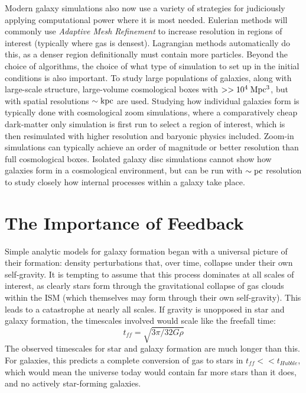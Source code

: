 Modern galaxy simulations also now use a variety of strategies for judiciously
applying computational power where it is most needed.  Eulerian methods will
commonly use \textit{Adaptive Mesh Refinement} to increase resolution in regions of
interest (typically where gas is densest).  Lagrangian methods automatically do
this, as a denser region definitionally must contain more particles.  Beyond the
choice of algorithms, the choice of what type of simulation to set up in the
initial conditions is also important.  To study large populations of galaxies,
along with large-scale structure, large-volume cosmological boxes with
$>>10^4\;\rm{Mpc^3}$, but with spatial resolutions $\sim \rm{kpc}$ are used.
Studying how individual galaxies form is typically done with cosmological zoom
simulations, where a comparatively cheap dark-matter only simulation is first
run to select a region of interest, which is then resimulated with higher
resolution and baryonic physics included. Zoom-in simulations can typically
achieve an order of magnitude or better resolution than full cosmological boxes.
Isolated galaxy disc simulations cannot show how galaxies form in a cosmological
environment, but can be run with $\sim \rm{pc}$ resolution to study closely how
internal processes within a galaxy take place.

\section{The Importance of Feedback}
Simple analytic models for galaxy formation began with a universal picture of
their formation:  density perturbations that, over time, collapse under their
own self-gravity.  It is tempting to assume that this process dominates at all
scales of interest, as clearly stars form through the gravitational collapse of
gas clouds within the ISM (which themselves may form through their own
self-gravity).  This leads to a catastrophe at nearly all scales.  If gravity
is unopposed in star and galaxy formation, the timescales involved would scale
like the freefall time:
\begin{equation}
    t_{ff} = \sqrt{3\pi/32G\rho}
\end{equation}
The observed timescales for star and galaxy formation are much longer than this.
For galaxies, this predicts a complete conversion of gas to stars in $t_{ff} <<
t_{Hubble}$, which would mean the universe today would contain far more stars
than it does, and no actively star-forming galaxies.

